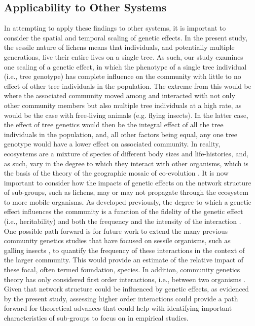 \documentclass[11pt,twocolumn,twoside,lineno]{pnas-new}
\begin{document}
\subsection*{Applicability to Other Systems}


In attempting to apply these findings to other systems, it is
important to consider the spatial and temporal scaling of genetic
effects. In the present study, the sessile nature of lichens means
that individuals, and potentially multiple generations, live their
entire lives on a single tree. As such, our study examines one scaling
of a genetic effect, in which the phenotype of a single tree
individual (i.e., tree genotype) has complete influence on the
community with little to no effect of other tree individuals in the
population. The extreme from this would be where the associated
community moved among and interacted with not only other community
members but also multiple tree individuals at a high rate, as would be
the case with free-living animals (e.g. flying insects). In the latter
case, the effect of tree genetics would then be the integral effect of
all the tree individuals in the population, and, all other factors
being equal, any one tree genotype would have a lower effect on
associated community. In reality, ecosystems are a mixture of species
of different body sizes and life-histories, and, as such, vary in the
degree to which they interact with other organisms, which is the basis
of the theory of the geographic mosaic of co-evolution
\cite{Thompson2013, Thompson2013a}. It is now important to consider
how the impacts of genetic effects on the network structure of
sub-groups, such as lichens, may or may not propagate through the
ecosystem to more mobile organisms. As developed previously, the
degree to which a genetic effect influences the community is a
function of the fidelity of the genetic effect (i.e., heritability)
and both the frequency and the intensity of the interaction
\cite{Shuster2006COMMUNITYSTRUCTURE}. One possible path forward is for
future work to extend the many previous community genetics studies
that have focused on sessile organisms, such as galling insects
\cite{Bailey2005ImportanceInteractions, Whitham2006a, Crutsinger2014,
  Solance2015, Keith2017}, to quantify the frequency of these
interactions in the context of the larger community. This would
provide an estimate of the relative impact of these focal, often
termed foundation, species. In addition, community genetics theory has
only considered first order interactions, i.e., between two organisms
\cite{Shuster2006COMMUNITYSTRUCTURE, Whitham2012,
  Whitham2020IntraspecificEvolution}. Given that network structure
could be influenced by genetic effects, as evidenced by the present
study, assessing higher order interactions could provide a path
forward for theoretical advances that could help with identifying
important characteristics of sub-groups to focus on in empirical
studies.
\end{document}
